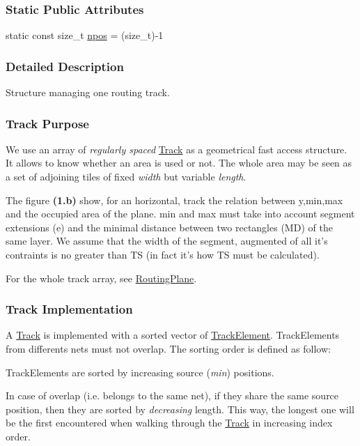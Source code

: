 \subsubsection*{Static Public Attributes}
\begin{DoxyCompactItemize}
\item 
static const size\-\_\-t \hyperlink{classKite_1_1Track_ae0070ea45b2592ce3701ab9e486e58a0}{npos} = (size\-\_\-t)-\/1
\end{DoxyCompactItemize}


\subsubsection{Detailed Description}
Structure managing one routing track. 

\hypertarget{classKite_1_1Track_secTrackPurpose}{}\subsubsection{Track Purpose}\label{classKite_1_1Track_secTrackPurpose}
We use an array of {\itshape regularly spaced} \hyperlink{classKite_1_1Track}{Track} as a geometrical fast access structure. It allows to know whether an area is used or not. The whole area may be seen as a set of adjoining tiles of fixed {\itshape width} but variable {\itshape length}.

The figure {\bfseries (1.\-b)} show, for an horizontal, track the relation between {\ttfamily y,min,max} and the occupied area of the plane. {\ttfamily min} and {\ttfamily max} must take into account segment extensions ({\ttfamily e}) and the minimal distance between two rectangles ({\ttfamily M\-D}) of the same layer. We assume that the width of the segment, augmented of all it's contraints is no greater than {\ttfamily T\-S} (in fact it's how {\ttfamily T\-S} must be calculated).

For the whole track array, see \hyperlink{classKite_1_1RoutingPlane}{Routing\-Plane}.

\hypertarget{classKite_1_1Track_secTrackImplementation}{}\subsubsection{Track Implementation}\label{classKite_1_1Track_secTrackImplementation}
A \hyperlink{classKite_1_1Track}{Track} is implemented with a sorted vector of \hyperlink{classKite_1_1TrackElement}{Track\-Element}. Track\-Elements from differents nets must not overlap. The sorting order is defined as follow\-:
\begin{DoxyItemize}
\item Track\-Elements are sorted by increasing source ({\itshape min}) positions.
\item In case of overlap (i.\-e. belongs to the same net), if they share the same source position, then they are sorted by {\itshape decreasing} length. This way, the longest one will be the first encountered when walking through the \hyperlink{classKite_1_1Track}{Track} in increasing index order.
\end{DoxyItemize}

